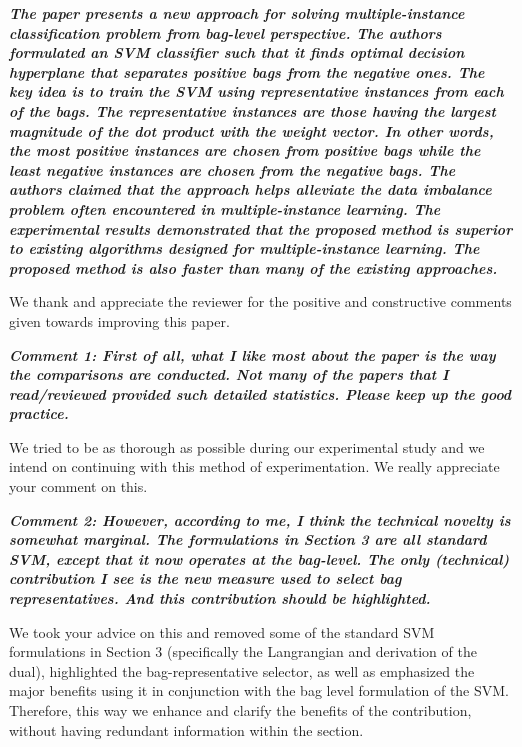 \documentclass[a4paper,notitlepage]{article}
\begin{document}
\noindent \textbf{\textit{The paper presents a new approach for solving multiple-instance classification 
problem from bag-level perspective. The authors formulated an SVM classifier such that it finds optimal decision hyperplane that separates positive bags from the negative ones. The key idea is to train the SVM using representative instances from each of the bags. The representative instances are those having the largest magnitude of the dot product with the weight vector. In other words, the most positive instances are chosen from positive bags while the least negative instances are chosen from the 
negative bags. The authors claimed that the approach helps alleviate the data imbalance problem often encountered in multiple-instance learning. The experimental results demonstrated that the proposed method is superior to existing algorithms designed for multiple-instance learning. The proposed method is also faster than many of the existing approaches. }}

\medskip

\noindent We thank and appreciate the reviewer for the positive and constructive comments given towards improving this paper.

\noindent \textbf{\textit{Comment 1: First of all, what I like most about the paper is the way the comparisons are conducted. Not many of the papers that I read/reviewed provided such detailed statistics. Please keep up the good practice. }}

\medskip

\noindent We tried to be as thorough as possible during our experimental study and we intend on continuing with this method of experimentation. We really appreciate your comment on this.

\noindent \textbf{\textit{Comment 2: However, according to me, I think the technical novelty is somewhat marginal. The formulations in Section 3 are all standard SVM, except that it now operates at the bag-level. The only (technical) contribution I see is the new measure used to select bag representatives. And this contribution should be highlighted. }}

\medskip

\noindent We took your advice on this and removed some of the standard SVM formulations in Section 3 (specifically the Langrangian and derivation of the dual), highlighted the bag-representative selector, as well as emphasized the major benefits using it in conjunction with the bag level formulation of the SVM. Therefore, this way we enhance and clarify the benefits of the contribution, without having redundant information within the section.
\end{document}
